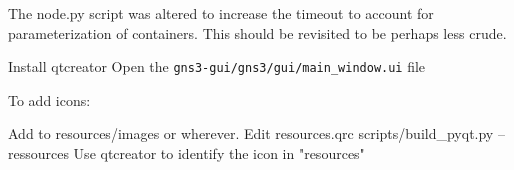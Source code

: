 \documentclass[12pt]{article}
\begin{document}
The node.py script was altered to increase the timeout to account for parameterization of
containers.  This should be revisited to be perhaps less crude.

Install qtcreator
Open the {\tt gns3-gui/gns3/gui/main\_window.ui} file

To add icons:
\begin{itemize}
   Add to resources/images or wherever.
   Edit resources.qrc
   scripts/build\_pyqt.py --ressources
   Use qtcreator to identify the icon in "resources"
\end{itemize}
\end{document}
